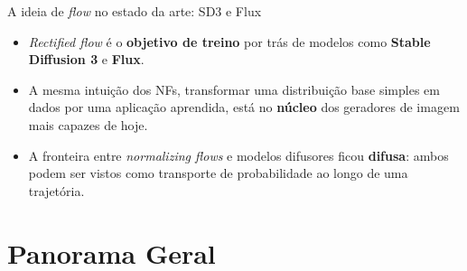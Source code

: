 \documentclass[aspectratio=169,xcolor=dvipsnames]{beamer}
\begin{document}
  \begin{frame}{A ideia de \textit{flow} no estado da arte: SD3 e Flux}
    \begin{itemize}
      \item \textit{Rectified flow} é o \textbf{objetivo de treino} por trás
      de modelos como \textbf{Stable Diffusion 3}
      e \textbf{Flux}.
      \item A mesma intuição dos NFs, transformar uma distribuição base
      simples em dados por uma aplicação aprendida, está no \textbf{núcleo}
      dos geradores de imagem mais capazes de hoje.
      \item A fronteira entre \textit{normalizing flows} e modelos difusores
      ficou \textbf{difusa}: ambos podem ser vistos como transporte de
      probabilidade ao longo de uma trajetória.
    \end{itemize}
  \end{frame}

  \section{Panorama Geral}
\end{document}
